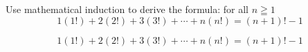 \newpage
\begin{example}
Use mathematical induction to derive the formula: for all $n \geqq 1$
    \begin{equation*}
        1(1!) + 2(2!) + 3(3!) + \cdots + n(n!) = (n+1)! - 1
    \end{equation*}

\begin{tcolorbox}
    \begin{theorem}
        \begin{equation*}
            1(1!) + 2(2!) + 3(3!) + \cdots + n(n!) = (n+1)! - 1
        \end{equation*} 
    \end{theorem}
\end{tcolorbox}

\end{example}



